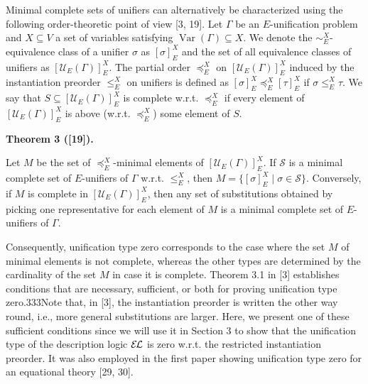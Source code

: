 \documentclass[10pt,a4paper]{amsart}
\begin{document}
Minimal complete sets of unifiers can alternatively be characterized using the following order-theoretic point of view [3, 19]. Let $\Gamma$ be an $E$-unification problem and $X\subseteq V$ a set of variables satisfying $\operatorname{Var}(\Gamma)\subseteq X$. We denote the $\sim_{E}^{X}$-equivalence class of a unifier $\sigma$ as $[\sigma]_{E}^{X}$ and the set of all equivalence classes of unifiers as $[\mathcal{U}_{E}(\Gamma)]_{E}^{X}$. The partial order $\preceq_{E}^{X}$ on $[\mathcal{U}_{E}(\Gamma)]_{E}^{X}$ induced by the instantiation preorder $\leq_{E}^{X}$ on unifiers is defined as $[\sigma]_{E}^{X}\preceq_{E}^{X}[\tau]_{E}^{X}$ if $\sigma\leq_{E}^{X}\tau$. We say that $S\subseteq[\mathcal{U}_{E}(\Gamma)]_{E}^{X}$ is complete w.r.t. $\preceq_{E}^{X}$ if every element of $[\mathcal{U}_{E}(\Gamma)]_{E}^{X}$ is above (w.r.t. $\preceq_{E}^{X}$) some element of $S$.\par
 
 
 
\par\medskip\noindent\textbf{Theorem 3 ([19]).}\par
 
 
Let $M$ be the set of $\preceq_{E}^{X}$-minimal elements of $[\mathcal{U}_{E}(\Gamma)]_{E}^{X}$. If $\mathcal{S}$ is a minimal complete set of $E$-unifiers of $\Gamma$ w.r.t. $\leq_{E}^{X}$, then $M=\{[\sigma]_{E}^{X}\mid\sigma\in\mathcal{S}\}$. Conversely, if $M$ is complete in $[\mathcal{U}_{E}(\Gamma)]_{E}^{X}$, then any set of substitutions obtained by picking one representative for each element of $M$ is a minimal complete set of $E$-unifiers of $\Gamma$.\par
 
 
 
 
Consequently, unification type zero corresponds to the case where the set $M$ of minimal elements is not complete, whereas the other types are determined by the cardinality of the set $M$ in case it is complete. Theorem 3.1 in [3] establishes conditions that are necessary, sufficient, or both for proving unification type zero.333Note that, in [3], the instantiation preorder is written the other way round, i.e., more general substitutions are larger.  Here, we present one of these sufficient conditions since we will use it in Section 3 to show that the unification type of the description logic $\mathcal{E\mkern-1.618muL}$ is zero w.r.t. the restricted instantiation preorder. It was also employed in the first paper showing unification type zero for an equational theory [29, 30].\par
 
\end{document}
